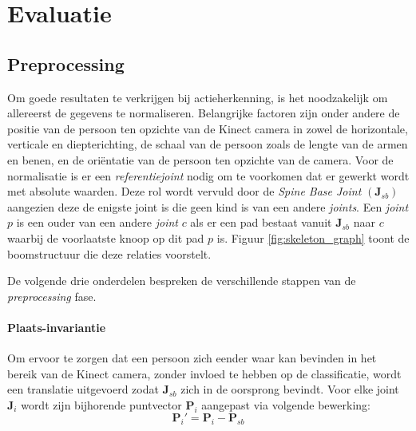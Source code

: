 \chapter{Evaluatie}

\section{Preprocessing}

Om goede resultaten te verkrijgen bij actieherkenning, is het noodzakelijk om allereerst de gegevens te normaliseren. Belangrijke factoren zijn onder andere de positie van de persoon ten opzichte van de Kinect camera in zowel de horizontale, verticale en diepterichting, de schaal van de persoon zoals de lengte van de armen en benen, en de oriëntatie van de persoon ten opzichte van de camera. Voor de normalisatie is er een \textit{referentiejoint} nodig om te voorkomen dat er gewerkt wordt met absolute waarden. Deze rol wordt vervuld door de \textit{Spine Base Joint} $(\textbf{J}_{sb})$ aangezien deze de enigste joint is die geen kind is van een andere \textit{joints}. Een \textit{joint} $p$ is een ouder van een andere \textit{joint} $c$ als er een pad bestaat vanuit $\textbf{J}_{sb}$ naar $c$ waarbij de voorlaatste knoop op dit pad $p$ is. Figuur \ref{fig:skeleton_graph} toont de boomstructuur die deze relaties voorstelt.



De volgende drie onderdelen bespreken de verschillende stappen van de \textit{preprocessing} fase.

\subsubsection{Plaats-invariantie}
Om ervoor te zorgen dat een persoon zich eender waar kan bevinden in het bereik van de Kinect camera, zonder invloed te hebben op de classificatie, wordt een translatie uitgevoerd zodat $\textbf{J}_{sb}$ zich in de oorsprong bevindt. Voor elke joint $\textbf{J}_i$ wordt zijn bijhorende puntvector $\textbf{P}_i$ aangepast via volgende bewerking:
$$\textbf{P}_i' = \textbf{P}_i - \textbf{P}_{sb}$$



